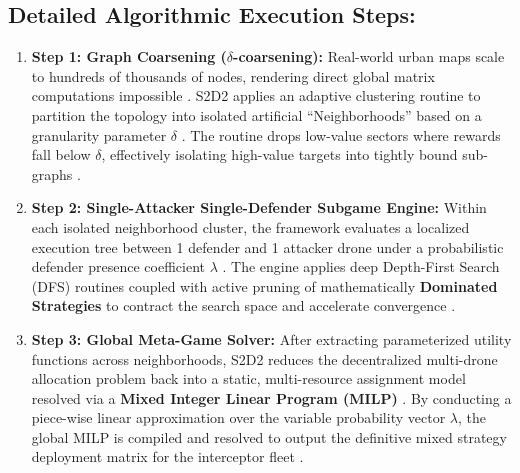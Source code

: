 \documentclass[../main.tex]{subfiles}
\begin{document}
\subsection*{Detailed Algorithmic Execution Steps:}
\begin{enumerate}
    \item \textbf{Step 1: Graph Coarsening ($\delta$-coarsening):} Real-world urban maps scale to hundreds of thousands of nodes, rendering direct global matrix computations impossible \cite{mutzari2025defending}. S2D2 applies an adaptive clustering routine to partition the topology into isolated artificial ``Neighborhoods'' based on a granularity parameter $\delta$ \cite{mutzari2025defending}. The routine drops low-value sectors where rewards fall below $\delta$, effectively isolating high-value targets into tightly bound sub-graphs \cite{mutzari2025defending}.
    \item \textbf{Step 2: Single-Attacker Single-Defender Subgame Engine:} Within each isolated neighborhood cluster, the framework evaluates a localized execution tree between 1 defender and 1 attacker drone under a probabilistic defender presence coefficient $\lambda$ \cite{korzhyk2010complexity}. The engine applies deep Depth-First Search (DFS) routines coupled with active pruning of mathematically \textbf{Dominated Strategies} to contract the search space and accelerate convergence \cite{mutzari2025defending}.
    \item \textbf{Step 3: Global Meta-Game Solver:} After extracting parameterized utility functions across neighborhoods, S2D2 reduces the decentralized multi-drone allocation problem back into a static, multi-resource assignment model resolved via a \textbf{Mixed Integer Linear Program (MILP)} \cite{mutzari2025defending}. By conducting a piece-wise linear approximation over the variable probability vector $\lambda$, the global MILP is compiled and resolved to output the definitive mixed strategy deployment matrix for the interceptor fleet \cite{mutzari2025defending}.
\end{enumerate}
\end{document}

